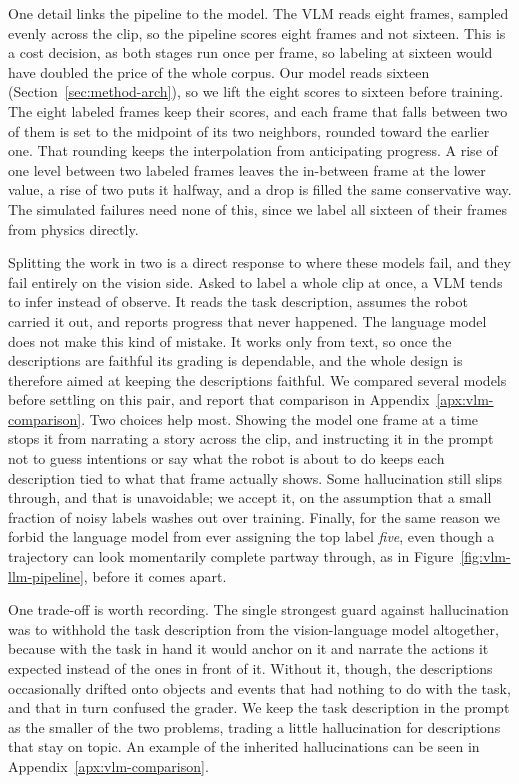 One detail links the pipeline to the model. The VLM reads eight frames, sampled evenly across the clip, so the pipeline scores eight frames and not sixteen. This is a cost decision, as both stages run once per frame, so labeling at sixteen would have doubled the price of the whole corpus. Our model reads sixteen (Section~\ref{sec:method-arch}), so we lift the eight scores to sixteen before training. The eight labeled frames keep their scores, and each frame that falls between two of them is set to the midpoint of its two neighbors, rounded toward the earlier one. That rounding keeps the interpolation from anticipating progress. A rise of one level between two labeled frames leaves the in-between frame at the lower value, a rise of two puts it halfway, and a drop is filled the same conservative way. The simulated failures need none of this, since we label all sixteen of their frames from physics directly.

Splitting the work in two is a direct response to where these models fail, and they fail entirely on the vision side. Asked to label a whole clip at once, a VLM tends to infer instead of observe. It reads the task description, assumes the robot carried it out, and reports progress that never happened. The language model does not make this kind of mistake. It works only from text, so once the descriptions are faithful its grading is dependable, and the whole design is therefore aimed at keeping the descriptions faithful. We compared several models before settling on this pair, and report that comparison in Appendix~\ref{apx:vlm-comparison}. Two choices help most. Showing the model one frame at a time stops it from narrating a story across the clip, and instructing it in the prompt not to guess intentions or say what the robot is about to do keeps each description tied to what that frame actually shows. Some hallucination still slips through, and that is unavoidable; we accept it, on the assumption that a small fraction of noisy labels washes out over training. Finally, for the same reason we forbid the language model from ever assigning the top label \emph{five}, even though a trajectory can look momentarily complete partway through, as in Figure~\ref{fig:vlm-llm-pipeline}, before it comes apart.

One trade-off is worth recording. The single strongest guard against hallucination was to withhold the task description from the vision-language model altogether, because with the task in hand it would anchor on it and narrate the actions it expected instead of the ones in front of it. Without it, though, the descriptions occasionally drifted onto objects and events that had nothing to do with the task, and that in turn confused the grader. We keep the task description in the prompt as the smaller of the two problems, trading a little hallucination for descriptions that stay on topic. An example of the inherited hallucinations can be seen in Appendix~\ref{apx:vlm-comparison}.

